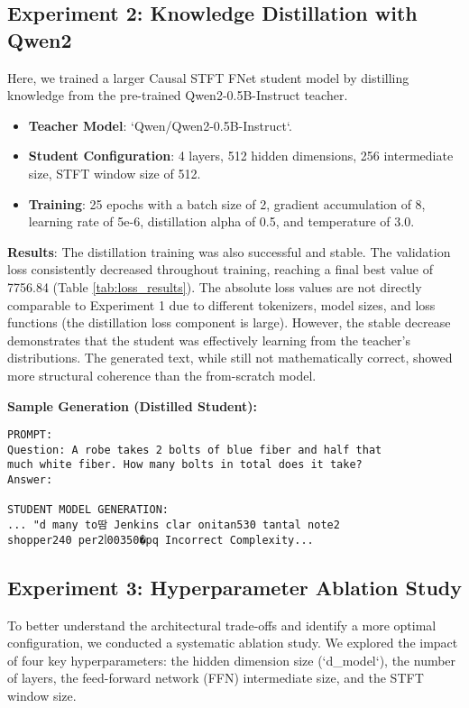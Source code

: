 \documentclass[11pt,a4paper]{article}
\begin{document}
\subsection{Experiment 2: Knowledge Distillation with Qwen2}
Here, we trained a larger Causal STFT FNet student model by distilling knowledge from the pre-trained Qwen2-0.5B-Instruct teacher.
\begin{itemize}
    \item \textbf{Teacher Model}: `Qwen/Qwen2-0.5B-Instruct`.
    \item \textbf{Student Configuration}: 4 layers, 512 hidden dimensions, 256 intermediate size, STFT window size of 512.
    \item \textbf{Training}: 25 epochs with a batch size of 2, gradient accumulation of 8, learning rate of 5e-6, distillation alpha of 0.5, and temperature of 3.0.
\end{itemize}

\textbf{Results}: The distillation training was also successful and stable. The validation loss consistently decreased throughout training, reaching a final best value of 7756.84 (Table \ref{tab:loss_results}). The absolute loss values are not directly comparable to Experiment 1 due to different tokenizers, model sizes, and loss functions (the distillation loss component is large). However, the stable decrease demonstrates that the student was effectively learning from the teacher's distributions. The generated text, while still not mathematically correct, showed more structural coherence than the from-scratch model.

\textbf{Sample Generation (Distilled Student):}
\begin{verbatim}
PROMPT:
Question: A robe takes 2 bolts of blue fiber and half that 
much white fiber. How many bolts in total does it take?
Answer:

STUDENT MODEL GENERATION:
... "d many to땀 Jenkins clar onitan530 tantal note2 
shopper240 per2ᥣ00350�pq Incorrect Complexity...
\end{verbatim}

\subsection{Experiment 3: Hyperparameter Ablation Study}
To better understand the architectural trade-offs and identify a more optimal configuration, we conducted a systematic ablation study. We explored the impact of four key hyperparameters: the hidden dimension size (`d_model`), the number of layers, the feed-forward network (FFN) intermediate size, and the STFT window size.
\end{document}
